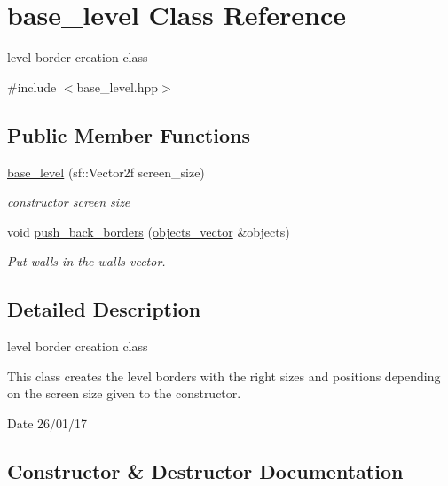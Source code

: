 \hypertarget{classbase__level}{}\section{base\+\_\+level Class Reference}
\label{classbase__level}


level border creation class  




{\ttfamily \#include $<$base\+\_\+level.\+hpp$>$}

\subsection*{Public Member Functions}
\begin{DoxyCompactItemize}
\item 
\hyperlink{classbase__level_addf165fdc5f4e953be3b6a2dcd00459b}{base\+\_\+level} (sf\+::\+Vector2f screen\+\_\+size)
\begin{DoxyCompactList}\small\item\em constructor screen size \end{DoxyCompactList}\item 
void \hyperlink{classbase__level_a3b2da28cf45cad434103e81ee6c4538d}{push\+\_\+back\+\_\+borders} (\hyperlink{typedefs_8hpp_a6c0fdb1dfd0c34dbbdbb5dcd3c608b07}{objects\+\_\+vector} \&objects)
\begin{DoxyCompactList}\small\item\em Put walls in the walls vector. \end{DoxyCompactList}\end{DoxyCompactItemize}


\subsection{Detailed Description}
level border creation class 

This class creates the level borders with the right sizes and positions depending on the screen size given to the constructor.

\begin{DoxyDate}{Date}
26/01/17 
\end{DoxyDate}


\subsection{Constructor \& Destructor Documentation}
\mbox{\label{classbase__level_addf165fdc5f4e953be3b6a2dcd00459b}} 
